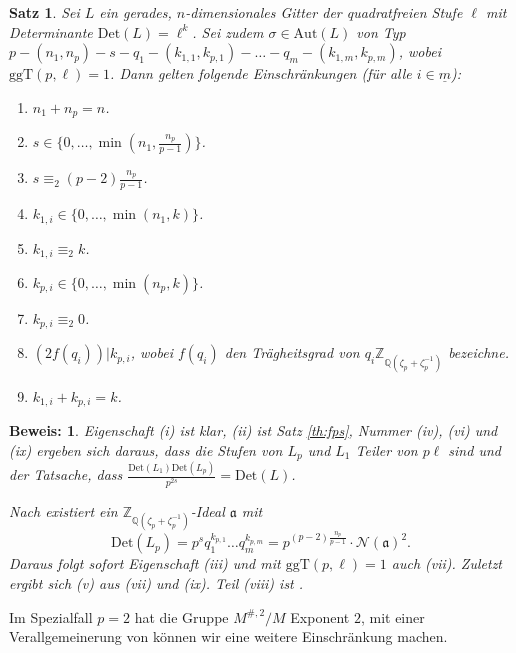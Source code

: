 \documentclass[12pt,a4paper,halfparskip,headsepline,bibtotocnumbered]{scrreprt}
\theoremstyle{nummermitklammern}
\newtheorem{satz}[defsatzusw]{Satz}
\theoremstyle{nonumberbreak}
\newtheorem{beweis}{Beweis:}
\newcommand{\Z}{\mathbb{Z}}
\newcommand{\Q}{\mathbb{Q}}
\newcommand{\No}{\mathcal{N}}
\newcommand{\Det}{\text{Det}}
\renewcommand{\a}{\mathfrak{a}}
\newcommand{\ggT}{\text{ggT}}
\newcommand{\Aut}{\text{Aut}}
\begin{document}
\begin{framed}
	\begin{satz} \label{th:restrict}
		Sei $L$ ein gerades, $n$-dimensionales Gitter der quadratfreien Stufe $\ell$ mit Determinante $\Det(L) = \ell^k$. Sei zudem $\sigma \in \Aut(L)$ von Typ $p - (n_1, n_p) - s - q_1 - (k_{1,1}, k_{p,1}) - \dots - q_m - (k_{1,m}, k_{p,m})$, wobei $\ggT(p, \ell) = 1$. Dann gelten folgende Einschränkungen (für alle $i \in \underline{m}$):
		\begin{enumerate}[label=(\roman*)]
			\item $n_1 + n_p = n$.
			\item $s \in \lbrace 0, \dots, \min(n_1, \frac{n_p}{p-1}) \rbrace$.
			\item $s \equiv_2 (p-2) \frac{n_p}{p-1}$.
			\item $k_{1,i} \in \lbrace 0, \dots, \min(n_1, k) \rbrace$.
			\item $k_{1,i} \equiv_2 k$.
			\item $k_{p,i} \in \lbrace 0, \dots, \min(n_p, k) \rbrace$.
			\item $k_{p,i} \equiv_2 0$.
			\item $\left( 2f(q_i)\right) \vert k_{p,i}$, wobei $f(q_i)$ den Trägheitsgrad von $q_i \Z_{\Q(\zeta_p + \zeta_p^{-1})}$ bezeichne.
			\item $k_{1,i} + k_{p,i} = k$.
		\end{enumerate}
	\end{satz}
\end{framed}

\begin{beweis}
	Eigenschaft (i) ist klar, (ii) ist Satz \eqref{th:fps}, Nummer (iv), (vi) und (ix) ergeben sich daraus, dass die Stufen von $L_p$ und $L_1$ Teiler von $p \ell$ sind und der Tatsache, dass $\frac{\Det(L_1) \Det(L_p)}{p^{2s}} = \Det(L)$.\par
	Nach \cite[Satz (3.1.4)(d) und Lemma (3.1.1)]{juergens} existiert ein $\Z_{\Q(\zeta_p + \zeta_p^{-1})}$-Ideal $\a$ mit
	\begin{equation*}
		\Det(L_p) = p^s q_1^{k_{p,1}} \dots q_m^{k_{p,m}} = p^{(p-2)\frac{n_p}{p-1}} \cdot \No(\a)^2.
	\end{equation*}
	Daraus folgt sofort Eigenschaft (iii) und mit $\ggT(p, \ell) = 1$ auch (vii). Zuletzt ergibt sich (v) aus (vii) und (ix). Teil (viii) ist \cite[Korollar (4.1.9)]{juergens}.
\end{beweis}

Im Spezialfall $p=2$ hat die Gruppe $M^{\#, 2} / M$ Exponent $2$, mit einer Verallgemeinerung von \cite[Lemma (4.9)]{nebe} können wir eine weitere Einschränkung machen.
\end{document}
